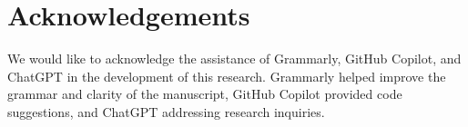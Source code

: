 \section*{Acknowledgements}

We would like to acknowledge the assistance of Grammarly, GitHub Copilot, and ChatGPT in the development of this research. Grammarly helped improve the grammar and clarity of the manuscript, GitHub Copilot provided code suggestions, and ChatGPT addressing research inquiries.